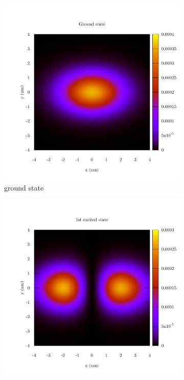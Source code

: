 \documentclass[12pt,a4]{article}
\begin{document}
\begin{figure}[H]
	\begin{subfigure}{.33\textwidth}
		\includegraphics[width=\textwidth]{../plots/state_0.pdf}
		\caption{ground state}
	\end{subfigure}
	\begin{subfigure}{.33\textwidth}
	\includegraphics[width=\textwidth]{../plots/state_1.pdf}

\end{subfigure}
\end{figure}
\end{document}
